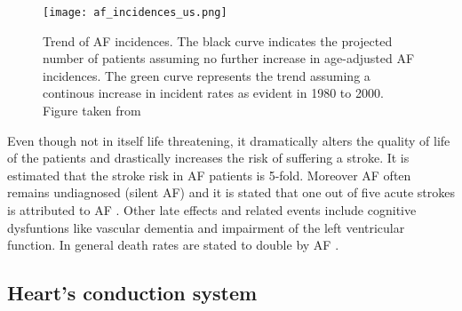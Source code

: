 \documentclass[type=dr, dr=rernat, accentcolor=tud7b,colorbacktitle, bigchapter, openright, twoside, 12pt ]{tudthesis}
\begin{document}
\begin{figure}[H]
\begin{center}
\texttt{[image: af\_incidences\_us.png]}
\caption{Trend of AF incidences. The black curve indicates the projected number of patients assuming no further increase in age-adjusted AF 
incidences. The green curve represents the trend assuming a continous increase in incident rates as evident in 1980 to 2000. Figure taken 
from \cite{Miy06}}
\label{USincidences}
\end{center}
\end{figure}

Even though not in itself life threatening, it dramatically alters the quality of life of the patients and drastically increases the risk 
of suffering a stroke. It is estimated that the stroke risk in AF patients is 5-fold. Moreover AF often remains undiagnosed (silent AF) and 
it is stated that one out of five acute strokes is attributed to AF \cite{ESC10}. Other late effects and related events include cognitive 
dysfuntions like vascular dementia and impairment of the left ventricular function. In general death rates are stated to double by 
AF \cite{ESC10}.\newline



\subsection{Heart's conduction system}
\end{document}
